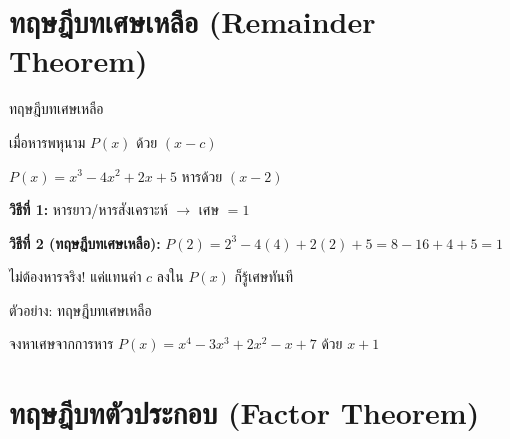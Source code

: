 \documentclass[11pt, aspectratio=169]{beamer}
\begin{document}
\section{ทฤษฎีบทเศษเหลือ (Remainder Theorem)}

\begin{frame}{ทฤษฎีบทเศษเหลือ}
  \begin{explanation}[ทฤษฎีบท]
    เมื่อหารพหุนาม $P(x)$ ด้วย $(x - c)$ 
  \end{explanation}

  \begin{exambox}[ตัวอย่าง]
    $P(x) = x^3 - 4x^2 + 2x + 5$ หารด้วย $(x - 2)$

    \textbf{วิธีที่ 1:} หารยาว/หารสังเคราะห์ $\rightarrow$ เศษ $= 1$

    \textbf{วิธีที่ 2 (ทฤษฎีบทเศษเหลือ):}
    $P(2) = 2^3 - 4(4) + 2(2) + 5 = 8 - 16 + 4 + 5 = 1$

  \end{exambox}

  \begin{intuition}[ประโยชน์]
    ไม่ต้องหารจริง! แค่แทนค่า $c$ ลงใน $P(x)$ ก็รู้เศษทันที
  \end{intuition}
\end{frame}\begin{frame}[t]{ตัวอย่าง: ทฤษฎีบทเศษเหลือ}
  \begin{exambox}[โจทย์]
    จงหาเศษจากการหาร $P(x) = x^4 - 3x^3 + 2x^2 - x + 7$ ด้วย $x + 1$
  \end{exambox}
  \vspace{\fill}


\end{frame}

\section{ทฤษฎีบทตัวประกอบ (Factor Theorem)}
\end{document}
